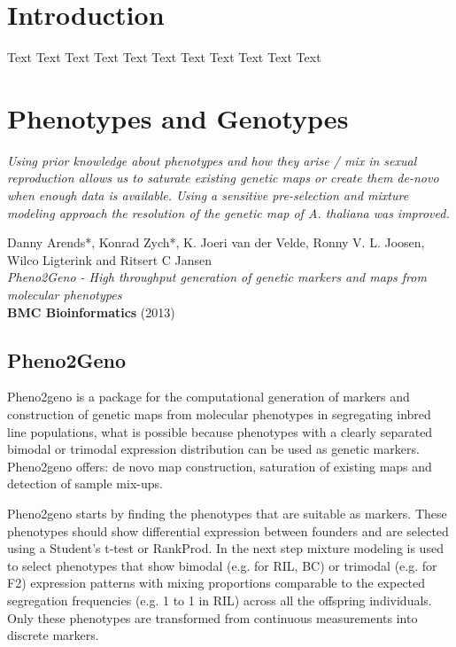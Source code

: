 \documentclass[8pt, twoside, a5paper]{report}
\newenvironment{myexampleblock}[1]{%
    \tcolorbox[beamer,%
    noparskip,breakable,
    colback=LightGreen,colframe=DarkGreen,%
    colbacklower=LimeGreen!75!LightGreen,%
    title=#1]}%
    {\endtcolorbox}
\newcommand{\authors}[1]{\small{#1}}
\newcommand{\bold}[1]{{\bfseries #1}}
\begin{document}
\tableofcontents

\chapter{Introduction}
Text Text Text Text Text Text Text Text Text Text Text

\chapter{Phenotypes and Genotypes}

\emph{Using prior knowledge about phenotypes and how they arise / mix in sexual reproduction allows us to saturate 
existing genetic maps or create them de-novo when enough data is available. Using a sensitive pre-selection 
and mixture modeling approach the resolution of the genetic map of \emph{A. thaliana} was improved.}

\null
\vfill

\begin{myexampleblock}{Under review:}
  \authors{Danny Arends*, Konrad Zych*, K. Joeri van der Velde, Ronny V. L. Joosen, Wilco Ligterink and Ritsert C Jansen}\\
  \emph{Pheno2Geno - High throughput generation of genetic markers and maps from molecular phenotypes}\\
  \bold{BMC Bioinformatics} (2013)
\end{myexampleblock}

\newpage

\section{Pheno2Geno}
Pheno2geno is a package for the computational generation of markers and construction of genetic maps from 
molecular phenotypes in segregating inbred line populations, what is possible because phenotypes with a 
clearly separated bimodal or trimodal expression distribution can be used as genetic markers. Pheno2geno 
offers: de novo map construction, saturation of existing maps and detection of sample mix-ups. 

Pheno2geno starts by finding the phenotypes that are suitable as markers. These phenotypes should show 
differential expression between founders and are selected using a Student's t-test or RankProd. In the 
next step mixture modeling is used to select phenotypes that show bimodal (e.g. for RIL, BC) or trimodal 
(e.g. for F2) expression patterns with mixing proportions comparable to the expected segregation 
frequencies (e.g. 1 to 1 in RIL) across all the offspring individuals. Only these phenotypes are 
transformed from continuous measurements into discrete markers.
\end{document}
